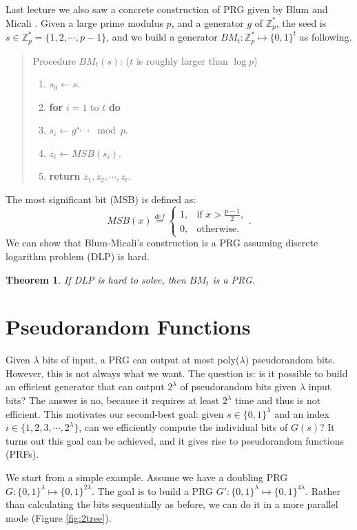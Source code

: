 \documentclass[12pt]{article}
\newcommand{\eqdef}{\stackrel{def}{=}}
\newcommand{\Z}{\mathbb{Z}}
\newcommand{\bits}{\{0,1\}}
\newcommand{\tab}{\hspace{0.3in}}
\newtheorem{theorem}{Theorem}[section]
\theoremstyle{definition}
\begin{document}
Last lecture we also saw a concrete construction of PRG given by Blum and Micali \cite{BM84}.
Given a large prime modulus $p$, and a generator $g$ of $\Z_p^*$, the seed is $s \in \Z_p^* = \{1,2,\cdots,p-1\}$, and we build a generator $BM_t : \Z_p^* \mapsto \bits^t$ as following.
\begin{quote}
Procedure $BM_t(s)$: ($t$ is roughly larger than $\log p$)
\begin{enumerate}
\item $s_0 \gets s$.
\item {\bf for} $i=1$ to $t$ {\bf do}
\item \tab $s_i \gets g^{s_{i-1}} \mod p$.
\item \tab $z_i \gets MSB(s_i)$.
\item {\bf return} $z_1,z_2,\cdots,z_t$.
\end{enumerate}
\end{quote}
The most significant bit (MSB) is defined as:
$$MSB(x) \eqdef \begin{cases}
1, & \textrm{if } x>\frac{p-1}{2}, \\
0, & \textrm{otherwise.}
\end{cases}.$$
We can show that Blum-Micali's construction is a PRG assuming discrete logarithm problem (DLP) is hard.
\begin{theorem}
If DLP is hard to solve, then $BM_t$ is a PRG.
\end{theorem}

\section{Pseudorandom Functions}
Given $\lambda$ bits of input, a PRG can output at most poly($\lambda$) pseudorandom bits. 
However, this is not always what we want.
The question is: is it possible to build an efficient generator that can output $2^\lambda$ of pseudorandom bits given $\lambda$ input bits?
The answer is no, because it requires at least $2^\lambda$ time and thus is not efficient. This motivates our second-best goal: given $s\in\bits^\lambda$ and an index $i\in\{1,2,3,\cdots,2^\lambda\}$, can we efficiently compute the individual bits of $G(s)$?
It turns out this goal can be achieved, and it gives rise to pseudorandom functions (PRFs).

We start from a simple example. Assume we have a doubling PRG $G : \bits^\lambda \mapsto \bits^{2\lambda}$. The goal is to build a PRG $G' : \bits^\lambda \mapsto \bits^{4\lambda}$. Rather than calculating the bits sequentially as before, we can do it in a more parallel mode (Figure \ref{fig:2tree}). 
\end{document}
